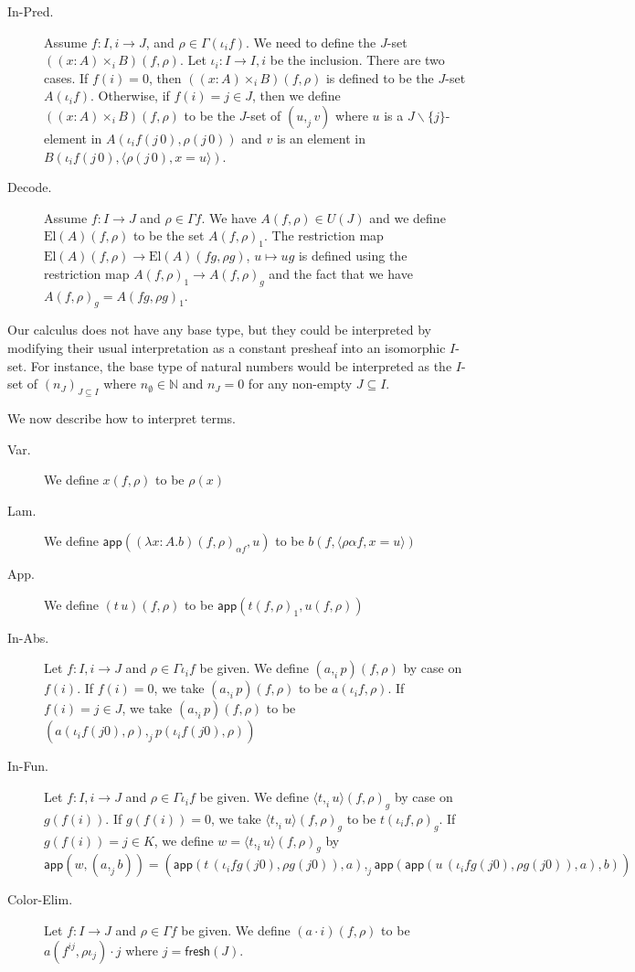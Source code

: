 \documentclass[english]{PaperTools/latex/lipics}
\newcommand\CTimes[2]{(#2) ×_{#1}}
\newcommand\param[1]{\!\cdot\!#1}
\newcommand\fp[3]{⟨#2 ,_{#1} #3⟩}
\def\fresh#1{\mathsf{fresh}(#1)}
\def\app#1#2{\mathsf{app}(#1,#2)}
\def\El#1{\mathrm{El}(#1)}
\begin{document}
\begin{description}
  \item[\sc In-Pred.]
    Assume $f : I,i → J$, and $ρ ∈ Γ(ι_if)$.  We need to define the $J$-set
    $(\CTimes i {x:A} B)(f,ρ)$.
    Let $ι_i : I → I,i$ be the inclusion. There are two cases. If $f(i) = 0$,
    then $(\CTimes i {x:A} B)(f,ρ)$ is defined to be the $J$-set $A(ι_i f)$.
    Otherwise, if $f(i) = j ∈ J$, then we define $(\CTimes i {x:A} B)(f,ρ)$ to
    be the $J$-set of $(u,_j v)$ where $u$ is a $J\backslash\{j\}$-element in
    $A(ι_i f(j\,0),ρ(j\,0))$ and $v$ is an element in
    $B(ι_i f(j\,0),⟨ρ(j\,0),x=u⟩)$.


  \item[\sc Decode.]
    Assume $f:I → J$ and $ρ ∈ Γf$.  We have $A(f,ρ) ∈ U(J)$ and we define
    $\El{A}(f,ρ)$ to be the set $A(f,ρ)_1$.
    The restriction map $\El{A}(f,ρ) → \El{A}(fg,ρ g)$, $u ↦ ug$ is defined
    using the restriction map $A(f,ρ)_1 → A(f,ρ)_g$ and the fact that we have
    $A(f,ρ)_g = A(fg,ρ g)_1$.
\end{description}

\begin{remark}
  Our calculus does not have any base type, but they could be interpreted
  by modifying their usual interpretation as a constant presheaf into an
  isomorphic $I$-set.
  For instance, the base type of natural numbers would be interpreted as
  the $I$-set of $(n_J)_{J ⊆ I}$ where $n_∅ ∈ ℕ$ and $n_J = 0$ for any
  non-empty $J ⊆ I$.
\end{remark}

\bigskip
We now describe how to interpret terms.
\begin{description}
  \item[\sc Var.]
    We define $x(f,ρ)$ to be $ρ(x)$

  \item[\sc Lam.]
    We define $\app{(λ x:A.b)(f,ρ)_{α f}}{u}$ to be $b(f,⟨ρα f,x=u⟩)$

  \item[\sc App.]
    We define $(t\,u)(f,ρ)$ to be $\app{t(f,ρ)_1}{u(f,ρ)}$

  \item[\sc In-Abs.]
    Let $f:I,i → J$ and $ρ ∈ Γι_i f$ be given.
    We define $(a ,_i p)(f,ρ)$ by case on $f(i)$.
    If $f(i) = 0$, we take $(a,_ip)(f,ρ)$ to be $a(ι_i f,ρ)$.
    If $f(i) = j ∈ J$, we take $(a,_ip)(f,ρ)$ to be $(a(ι_if(j0),ρ),_j p(ι_if(j0),ρ))$

  \item[\sc In-Fun.]
    Let $f:I,i → J$ and $ρ ∈ Γι_i f$ be given.
    We define ${\fp i t u}(f,ρ)_g$ by case on $g(f(i))$.
    If $g(f(i)) = 0$, we take ${\fp i t u}(f,ρ)_g$ to be $t(ι_i f,ρ)_g$.
    If $g(f(i)) = j ∈ K$, we define $w = {\fp i t u}(f,ρ)_g$ by
    $$\app{w}{(a ,_j b)} =
      ( \app{t\,(ι_i fg(j0),ρ g(j0))}{a}
      ,_j
        {\app{\app{u\,(ι_i fg(j0),ρ g(j0))}{a}}{b}}
      )$$

  \item[\sc Color-Elim.]
    Let $f:I → J$ and $ρ ∈ Γ f$ be given.
    We define $(a \param i)(f,ρ)$ to be $a(f^{ij},ρι_j)\param j$
    where $j = \fresh{J}$.
\end{description}
\end{document}
